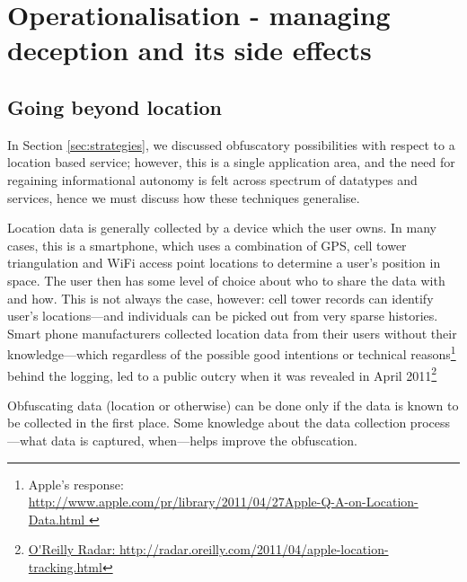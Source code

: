 \documentclass{IOS-Book-Article}     %
\begin{document}
\section{Operationalisation - managing deception and its side effects}

\subsection{Going beyond location}

In Section \ref{sec:strategies}, we discussed obfuscatory possibilities with
respect to a location based service; however, this is a single application area,
and the need for regaining informational autonomy is felt across spectrum of
datatypes and services, hence we must discuss how these techniques generalise.

Location data is generally collected by a device which the user owns. In many
cases, this is a smartphone, which uses a combination of GPS, cell tower
triangulation and WiFi access point locations to determine a user's position in
space. The user then has some level of choice about who to share the data with
and how. This is not always the case, however: cell tower records can identify
user's locations---and individuals can be picked out from very sparse
histories\cite{montjoye2013Unique}. Smart phone manufacturers collected 
location data from their users without their knowledge---which regardless of the 
possible good intentions or technical reasons\footnote{Apple's response:\\\url{http://www.apple.com/pr/library/2011/04/27Apple-Q-A-on-Location-Data.html 
}} behind the logging, led to a public outcry when it was revealed in April 
2011\footnote{\url{O'Reilly Radar: http://radar.oreilly.com/2011/04/apple-location-tracking.html}
}

Obfuscating data (location or otherwise) can be done only if the data is 
known to be collected in the first place. Some knowledge about the data 
collection process---what data is captured, when---helps improve the obfuscation. 
\end{document}
